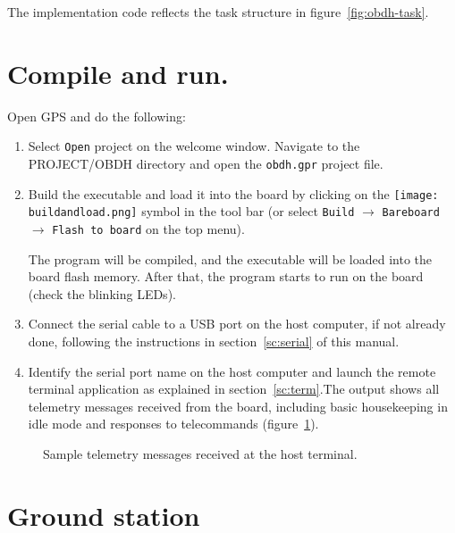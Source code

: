 The implementation code reflects the task structure in figure~\ref{fig:obdh-task}.

\section{Compile and run.}

Open GPS and do the following:
\begin{enumerate}
\item Select {\tt Open} project on the welcome window. Navigate to the PROJECT/OBDH directory and open the {\tt obdh.gpr} project file.
\item Build the executable and load it into the board by clicking on the \hbox{\texttt{[image: buildandload.png]}} symbol in the tool bar (or select {\tt Build} $\rightarrow$ {\tt Bareboard} $\rightarrow$ {\tt Flash to board} on the top menu).

The program will be compiled, and the executable will be loaded into the board flash memory. After that, the program starts to run on the board (check the blinking LEDs).
\item Connect the serial cable to a USB port on the host computer, if not already done, following the instructions in section~\ref{sc:serial} of this manual.

\item Identify the serial port name on the host computer and launch the remote terminal application as explained in section~\ref{sc:term}.The output shows all telemetry messages received from the board, including basic housekeeping
in idle mode and responses to telecommands (figure~\ref{fig:obdh-output}).
\end{enumerate}

\begin{figure}[h]
            \caption{Sample telemetry messages received at the host terminal.}
            \label{fig:obdh-output}
\end{figure}

\section{Ground station}

